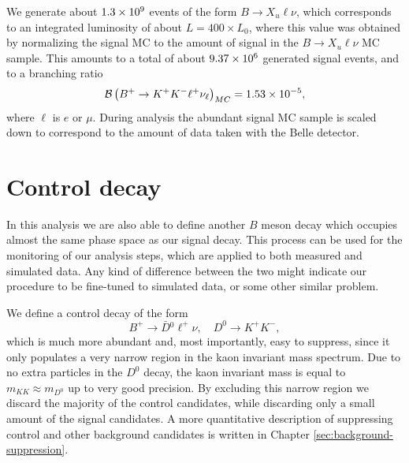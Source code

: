 We generate about $1.3\times 10^{9}$ events of the form $B\to X_u \ell \nu$, which corresponds to an integrated luminosity of about $L = 400\times L_0$, where this value was obtained by normalizing the signal MC to the amount of signal in the $B\to X_u \ell \nu$ MC sample. This amounts to a total of about $9.37\times 10^{6}$ generated signal events, and to a branching ratio
\begin{equation}
\mathcal{B}\left(B^+ \to K^+ K^- \ell^+ \nu_\ell\right)_{MC} = 1.53\times 10^{-5},
\end{equation}
where $\ell$ is $e$ or $\mu$. During analysis the abundant signal MC sample is scaled down to correspond to the amount of data taken with the Belle detector.

\section{Control decay}\label{sec:control-decay}

In this analysis we are also able to define another $B$ meson decay which occupies almost the same phase space as our signal decay. This process can be used for the monitoring of our analysis steps, which are applied to both measured and simulated data. Any kind of difference between the two might indicate our procedure to be fine-tuned to simulated data, or some other similar problem. 

We define a control decay of the form $$B^+ \to \bar D {}^0 \ell^+ \nu, \quad D^0 \to K^+ K^-,$$ which is much more abundant and, most importantly, easy to suppress, since it only populates a very narrow region in the kaon invariant mass spectrum. Due to no extra particles in the $D^0$ decay, the kaon invariant mass is equal to $m_{KK} \approx m_{D^0}$ up to very good precision. By excluding this narrow region we discard the majority of the control candidates, while discarding only a small amount of the signal candidates. A more quantitative description of suppressing control and other background candidates is written in Chapter \ref{sec:background-suppression}.